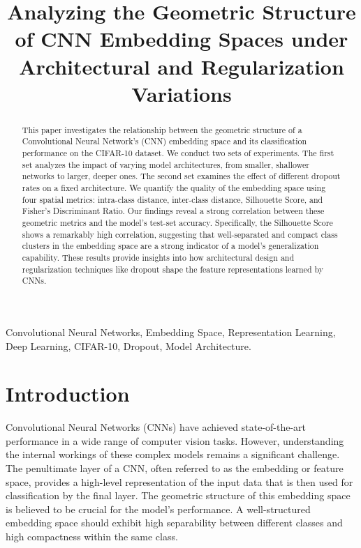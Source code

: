 \documentclass[conference]{IEEEtran}
\begin{document}
\title{Analyzing the Geometric Structure of CNN Embedding Spaces under Architectural and Regularization Variations}

\author{
}

\maketitle

\begin{abstract}
This paper investigates the relationship between the geometric structure of a Convolutional Neural Network's (CNN) embedding space and its classification performance on the CIFAR-10 dataset. We conduct two sets of experiments. The first set analyzes the impact of varying model architectures, from smaller, shallower networks to larger, deeper ones. The second set examines the effect of different dropout rates on a fixed architecture. We quantify the quality of the embedding space using four spatial metrics: intra-class distance, inter-class distance, Silhouette Score, and Fisher's Discriminant Ratio. Our findings reveal a strong correlation between these geometric metrics and the model's test-set accuracy. Specifically, the Silhouette Score shows a remarkably high correlation, suggesting that well-separated and compact class clusters in the embedding space are a strong indicator of a model's generalization capability. These results provide insights into how architectural design and regularization techniques like dropout shape the feature representations learned by CNNs.
\end{abstract}

\begin{IEEEkeywords}
Convolutional Neural Networks, Embedding Space, Representation Learning, Deep Learning, CIFAR-10, Dropout, Model Architecture.
\end{IEEEkeywords}

\section{Introduction}
Convolutional Neural Networks (CNNs) have achieved state-of-the-art performance in a wide range of computer vision tasks. However, understanding the internal workings of these complex models remains a significant challenge. The penultimate layer of a CNN, often referred to as the embedding or feature space, provides a high-level representation of the input data that is then used for classification by the final layer. The geometric structure of this embedding space is believed to be crucial for the model's performance. A well-structured embedding space should exhibit high separability between different classes and high compactness within the same class.
\end{document}

